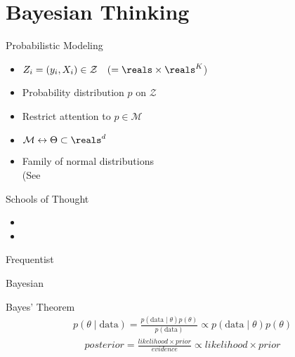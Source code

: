\section{Bayesian Thinking}

\begin{frame}{Probabilistic Modeling}
  \Large{
  \begin{itemize}
    \item[]  $Z_i = (y_i, X_i) \in \mathcal{Z} \quad (=\reals \times \reals^K$)\pause
    \item[]  Probability distribution $p$ on $\mathcal{Z}$\pause
    \item[]  Restrict attention to $p \in \mathcal{M}$\pause
    \item[]  $\mathcal{M} \leftrightarrow \Theta \subset \reals^d$\pause
    \item[]  Family of normal distributions\pause\\
    \quad\quad\quad\quad (See \pause {}
  \end{itemize}
  }
\end{frame}

\begin{frame}{Schools of Thought}
  \Large{
  \begin{itemize}
    \item[] 
    \item[] 
  \end{itemize}
  }
\end{frame}

\begin{frame}{Frequentist}
\end{frame}

\begin{frame}{Bayesian}
\end{frame}

\begin{frame}{Bayes' Theorem}
  \Large{
    \begin{align*}
      p(\theta \mid \text{data}) = \frac{p(\text{data} \mid \theta) p(\theta)}{p(\text{data})} \propto p(\text{data} \mid \theta) p(\theta)
    \end{align*}\pause
    \vfill
    \begin{align*}
      posterior = \frac{likelihood \times prior}{evidence} \propto likelihood \times prior
    \end{align*}
  }
\end{frame}

